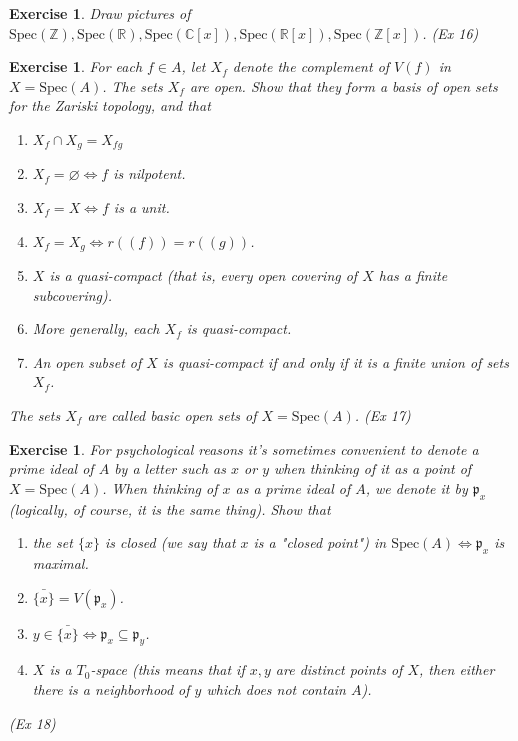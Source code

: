 \documentclass[]{report}
\newtheorem{exercise}[theorem]{Exercise}
\begin{document}
\begin{exercise}
    Draw pictures of $\text{Spec}(\mathbb{Z}), \text{Spec}(\mathbb{R}), \text{Spec}(\mathbb{C}[x]), \text{Spec}(\mathbb{R}[x]), \text{Spec}(\mathbb{Z}[x])$. (Ex 16)
\end{exercise}
       
\begin{exercise}
    For each $f\in A$, let $X_f$ denote the complement of $V(f)$ in $X = \text{Spec}(A)$. The sets $X_f$ are open. Show that they form a basis of open sets for the Zariski topology, and that
    \begin{enumerate}
        \item $X_f \cap X_g = X_{fg}$
        \item $X_f = \varnothing \Leftrightarrow f$ is nilpotent.
        \item $X_f = X \Leftrightarrow f$ is a unit.
        \item $X_f = X_g \Leftrightarrow r((f)) = r((g))$.
        \item $X$ is a quasi-compact (that is, every open covering of $X$ has a finite subcovering).
        \item More generally, each $X_f$ is quasi-compact.
        \item An open subset of $X$ is quasi-compact if and only if it is a finite union of sets $X_f$. 
    \end{enumerate}
    The sets $X_f$ are called basic open sets of $X = \text{Spec}(A)$. (Ex 17)
\end{exercise}

\begin{exercise}
    For psychological reasons it's sometimes convenient to denote a prime ideal of $A$ by a letter such as $x$ or $y$ when thinking of it as a point of $X = \text{Spec}(A)$. When thinking of $x$ as a prime ideal of $A$, we denote it by $\mathfrak{p}_x$ (logically, of course, it is the same thing). Show that
    \begin{enumerate}
    \item the set $\{x\}$ is closed (we say that $x$ is a "closed point") in $\text{Spec}(A) \Leftrightarrow \mathfrak{p}_x$ is maximal.
    \item  $\bar{\{x\}} = V(\mathfrak{p}_x)$.
    \item $y\in \bar{\{x\}} \Leftrightarrow \mathfrak{p}_x \subseteq \mathfrak{p}_y$. 
    \item $X$ is a $T_0$-space (this means that if $x, y$ are distinct points of $X$, then either there is a neighborhood of $y$ which does not contain $A$).
    \end{enumerate}
    (Ex 18)
\end{exercise}
\end{document}

